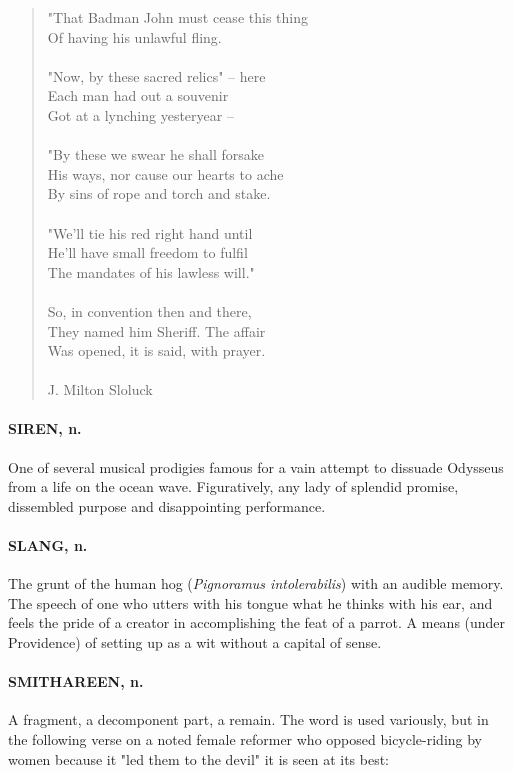 \documentclass[11pt]{article}
\begin{document}
\begin{quote}
  "That Badman John must cease this thing \\
  Of having his unlawful fling. \\
 \\
  "Now, by these sacred relics" -- here \\
  Each man had out a souvenir \\
  Got at a lynching yesteryear -- \\
 \\
  "By these we swear he shall forsake \\
  His ways, nor cause our hearts to ache \\
  By sins of rope and torch and stake. \\
 \\
  "We'll tie his red right hand until \\
  He'll have small freedom to fulfil \\
  The mandates of his lawless will." \\
 \\
  So, in convention then and there, \\
  They named him Sheriff.  The affair \\
  Was opened, it is said, with prayer. \\
 \\
J. Milton Sloluck \end{quote}


\paragraph{SIREN, n.}  One of several musical prodigies famous for a vain attempt
to dissuade Odysseus from a life on the ocean wave.  Figuratively, any
lady of splendid promise, dissembled purpose and disappointing
performance.

\paragraph{SLANG, n.}  The grunt of the human hog ({\em Pignoramus intolerabilis})
with an audible memory.  The speech of one who utters with his tongue
what he thinks with his ear, and feels the pride of a creator in
accomplishing the feat of a parrot.  A means (under Providence) of
setting up as a wit without a capital of sense.

\paragraph{SMITHAREEN, n.}  A fragment, a decomponent part, a remain.  The word is
used variously, but in the following verse on a noted female reformer
who opposed bicycle-riding by women because it "led them to the devil"
it is seen at its best:
\end{document}
